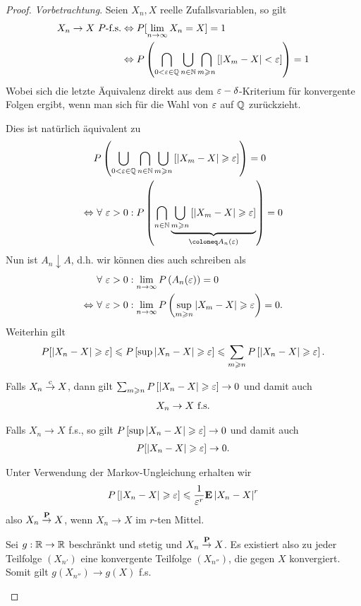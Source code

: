 \begin{proof}
\textit{Vorbetrachtung}. Seien $X_n,X$ reelle Zufallsvariablen, so gilt
\begin{align*}
X_n\to X\ P\text{-f.s.} &\Leftrightarrow P[\lim\limits_{n\to\infty} X_n = X] = 1\\
&\Leftrightarrow
P\left(\bigcap_{0<\varepsilon\in\mathbb{Q}}\bigcup_{n\in\mathbb{N}}\bigcap_{m\geqslant n} \left[\left|X_m -
X\right|<\varepsilon\right]\right) = 1
\end{align*}
Wobei sich die letzte Äquivalenz direkt aus dem $\varepsilon-\delta$-Kriterium für
konvergente Folgen ergibt, wenn man sich für die Wahl von $\varepsilon$ auf
$\mathbb{Q}$ zurückzieht.

Dies ist natürlich äquivalent zu
\begin{align*}
&P\left(\bigcup_{0<\ep\in\Q}\bigcap_{n\in\N}\bigcup_{m\ge n} \left[\abs{X_m -
X}\ge\ep\right]\right) = 0\\
\Leftrightarrow
&\forall \ep > 0 :  P\left(\bigcap_{n\in\N}\underbrace{\bigcup_{m\ge n}
\left[\abs{X_m - X}\ge\ep\right]}_{\defl A_{n}(\ep)}\right) = 0
\end{align*}
Nun ist $A_n\downarrow A$, d.h. wir können dies auch schreiben als
\begin{align*}
&\forall \ep > 0 : 
\lim\limits_{n\to\infty}P\left(A_n(\ep)\right) = 0\\
\Leftrightarrow
&
\forall \ep > 0 : 
\lim\limits_{n\to\infty}P\left(\sup_{m\ge n} \abs{X_m-X}\ge \ep\right) = 0.
\end{align*}
Weiterhin gilt
\begin{align*}
P[\left|X_n-X\right|\geqslant \varepsilon] \leqslant
P\left[\sup \left|X_n-X\right|\geqslant \varepsilon\right] \leqslant
\sum\limits_{m\geqslant n} P\left[\left|X_n-X\right|\geqslant \varepsilon\right].
\end{align*}
\begin{proofenum}
  \item Falls $X_n\overset{\mathrm{c}}{\to} X$, dann gilt $\sum_{m\geqslant n}
  P\left[\left|X_n-X\right|\geqslant \varepsilon\right]\to 0$ und damit auch
\begin{align*}
X_n\to X \ \text{f.s.}
\end{align*} 
\item Falls $X_n\to X$ f.s., so gilt $P\left[\sup \left|X_n-X\right|\geqslant \varepsilon\right]\to
0$ und damit auch
\begin{align*}
P[\left|X_n-X\right|\geqslant \varepsilon]\to 0.
\end{align*}
\item Unter Verwendung der Markov-Ungleichung erhalten wir
\begin{align*}
P\left[\left|X_n-X\right|\geqslant \varepsilon\right] \leqslant \frac{1}{\varepsilon^r}\textbf{E} \left|X_n-X\right|^r
\end{align*}
also $X_n\overset{\mathbf{P}}{\to} X$, wenn $X_n\to X$ im $r$-ten Mittel.
\item Sei  $g:\mathbb{R}\to\mathbb{R}$ beschränkt und stetig und $X_n\overset{\mathbf{P}}{\to} X$. Es existiert also
zu jeder Teilfolge $(X_{n'})$ eine konvergente Teilfolge $(X_{n''})$, die gegen
$X$ konvergiert. Somit gilt
$g(X_{n''})\to g(X)$ f.s.


\end{proofenum}
\end{proof}
